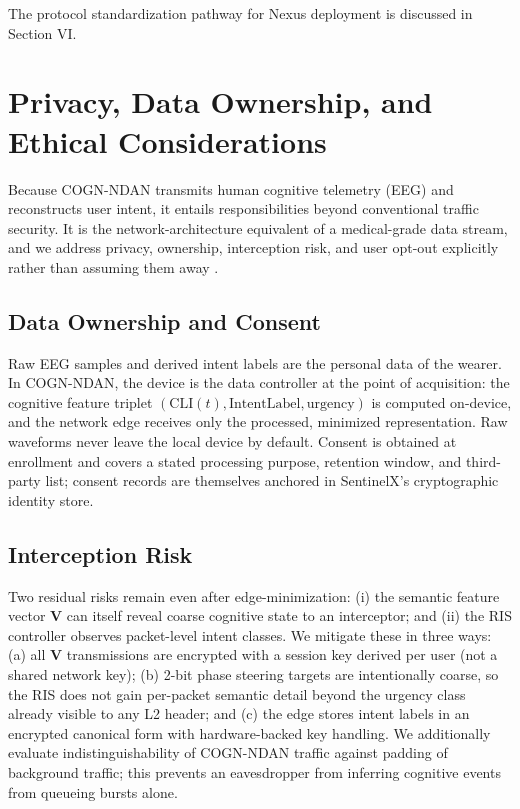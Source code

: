 \documentclass[journal]{IEEEtran}
\newcommand{\COGN}{COGN-NDAN}
\begin{document}
The protocol standardization pathway for Nexus deployment is discussed in Section VI.

\section{Privacy, Data Ownership, and Ethical Considerations}

Because \COGN{} transmits human cognitive telemetry (EEG) and reconstructs user intent, it entails responsibilities beyond conventional traffic security. It is the network-architecture equivalent of a medical-grade data stream, and we address privacy, ownership, interception risk, and user opt-out explicitly rather than assuming them away \cite{xia2023bci}.

\subsection{Data Ownership and Consent}
Raw EEG samples and derived intent labels are the personal data of the wearer. In \COGN{}, the device is the data controller at the point of acquisition: the cognitive feature triplet $(\mathrm{CLI}(t), \mathrm{IntentLabel}, \mathrm{urgency})$ is computed on-device, and the network edge receives only the processed, minimized representation. Raw waveforms never leave the local device by default. Consent is obtained at enrollment and covers a stated processing purpose, retention window, and third-party list; consent records are themselves anchored in SentinelX's cryptographic identity store.

\subsection{Interception Risk}
Two residual risks remain even after edge-minimization: (i) the semantic feature vector $\mathbf{V}$ can itself reveal coarse cognitive state to an interceptor; and (ii) the RIS controller observes packet-level intent classes. We mitigate these in three ways: (a) all $\mathbf{V}$ transmissions are encrypted with a session key derived per user (not a shared network key); (b) 2-bit phase steering targets are intentionally coarse, so the RIS does not gain per-packet semantic detail beyond the urgency class already visible to any L2 header; and (c) the edge stores intent labels in an encrypted canonical form with hardware-backed key handling. We additionally evaluate indistinguishability of \COGN{} traffic against padding of background traffic; this prevents an eavesdropper from inferring cognitive events from queueing bursts alone.
\end{document}
